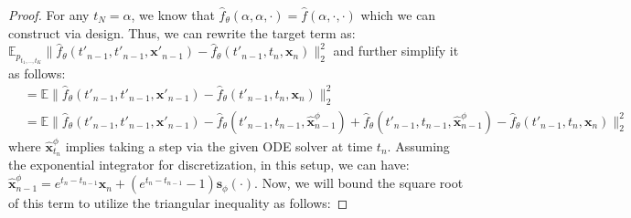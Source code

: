 \documentclass[11pt]{article}
\def\rvx{{\mathbf{x}}}
\def\vs{{\bm{s}}}
\newcommand{\E}{\mathbb{E}}
\begin{document}
\vspace{-0.2in}
\begin{proof}
For any $t_N=\alpha$, we know that $\hat{f}_\theta(\alpha,\alpha,\cdot)=\hat{f}(\alpha,\cdot,\cdot)$ which we can construct via design. Thus, we can rewrite the target term as: $\E_{p_{t_1,..,t_K}}  
  \|
  \hat{f}_\theta(t'_{n-1},t'_{n-1},{\rvx}'_{n-1})-\hat{f}_\theta(t'_{n-1},t_n,{\rvx}_n)\|_2^2$ and further simplify it as follows:
  \vspace{0.1in}
\begin{align*}
& = \E  
  \| 
  \hat{f}_\theta(t'_{n-1},t'_{n-1},{\rvx}'_{n-1})-\hat{f}_\theta(t'_{n-1},t_{n},{\rvx}_n)\|_2^2 \\
 & = \E  
  \| 
  \hat{f}_\theta(t'_{n-1},t'_{n-1},{\rvx}'_{n-1}) - \hat{f}_\theta(t'_{n-1},t_{n-1},\hat{\rvx}^\phi_{n-1}) + \hat{f}_\theta(t'_{n-1},t_{n-1},\hat{\rvx}^\phi_{n-1})-\hat{f}_\theta(t'_{n-1},t_n,{\rvx}_n)\|_2^2 
\end{align*}
where $\hat{\rvx}^\phi_{t_n}$ implies taking a step via the given ODE solver at time $t_n$. Assuming the exponential integrator for discretization, in this setup, we can have: $\hat{\rvx}^\phi_{n-1} = e^{t_{n}-t_{n-1}}\rvx_{n}+ (e^{t_n-t_{n-1}}-1)\vs_\phi(\cdot)$. Now, we will bound the square root of this term to utilize the triangular inequality as follows:

\end{proof}
\end{document}
